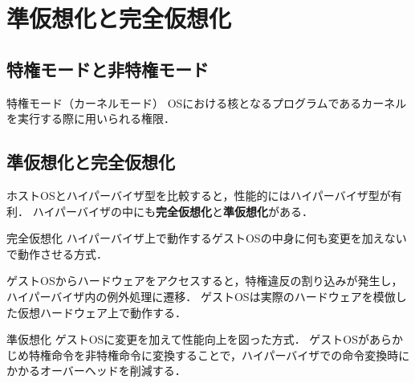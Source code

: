 \section{準仮想化と完全仮想化}
\tocc
\subsection{特権モードと非特権モード}
\begin{frame}[t]{\ftitle}
    \begin{block}{特権モード（カーネルモード）}
        OSにおける核となるプログラムであるカーネルを実行する際に用いられる権限．
    \end{block}
\end{frame}
\subsection{準仮想化と完全仮想化}
\begin{frame}[t]{\ftitle}
    ホストOSとハイパーバイザ型を比較すると，性能的にはハイパーバイザ型が有利．
    ハイパーバイザの中にも\textbf{完全仮想化}と\textbf{準仮想化}がある．
    \begin{block}{完全仮想化}
        ハイパーバイザ上で動作するゲストOSの中身に何も変更を加えないで動作させる方式．
    \end{block}
    ゲストOSからハードウェアをアクセスすると，特権違反の割り込みが発生し，ハイパーバイザ内の例外処理に遷移．
    ゲストOSは実際のハードウェアを模倣した仮想ハードウェア上で動作する．
\end{frame}
\begin{frame}[t]{\ftitle}
    \begin{block}{準仮想化}
        ゲストOSに変更を加えて性能向上を図った方式．
        ゲストOSがあらかじめ特権命令を非特権命令に変換することで，ハイパーバイザでの命令変換時にかかるオーバーヘッドを削減する．
    \end{block}
\end{frame}

